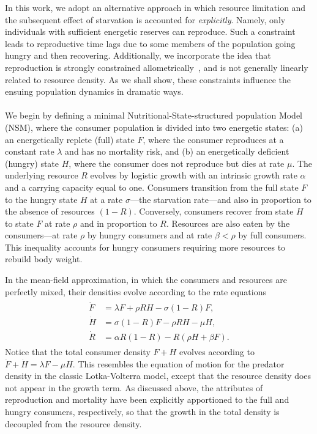 \documentclass{pnastwo}
\begin{document}
\begin{article}
In this work, we adopt an alternative approach in which resource limitation
and the subsequent effect of starvation is accounted for \emph{explicitly}.
Namely, only individuals with sufficient energetic reserves can reproduce.
Such a constraint leads to reproductive time lags due to some members of the
population going hungry and then recovering.  Additionally, we incorporate the
idea that reproduction is strongly constrained
allometrically~\cite{Kempes:2012hy}, and is not generally linearly related to
resource density.  As we shall show, these constraints influence the ensuing
population dynamics in dramatic ways.
\\

\\
We begin by defining a minimal Nutritional-State-structured population Model
(NSM), where the consumer population is divided into two energetic states:
(a) an energetically replete (full) state $F$, where the consumer reproduces
at a constant rate $\lambda$ and has no mortality risk, and (b) an
energetically deficient (hungry) state $H$, where the consumer does not
reproduce but dies at rate $\mu$.  The underlying resource $R$ evolves by
logistic growth with an intrinsic growth rate $\alpha$ and a carrying
capacity equal to one.  Consumers transition from the full state $F$ to the
hungry state $H$ at a rate $\sigma$---the starvation rate---and also in
proportion to the absence of resources $(1-R)$.  Conversely, consumers
recover from state $H$ to state $F$ at rate $\rho$ and in proportion to $R$.
Resources are also eaten by the consumers---at rate $\rho$ by hungry
consumers and at rate $\beta<\rho$ by full consumers.  This inequality
accounts for hungry consumers requiring more resources to rebuild body
weight.

In the mean-field approximation, in which the consumers and resources are
perfectly mixed, their densities evolve according to the rate equations
\begin{eqnarray} 
\label{eq:system}
\begin{split}
\dot{F} &= \lambda F + \rho RH - \sigma (1-R)F,  \\
\dot{H} &= \sigma (1-R)F - \rho RH - \mu H,  \\
\dot{R} &= \alpha R(1-R) - R(\rho H+ \beta F).
\end{split}
\end{eqnarray}
Notice that the total consumer density $F+H$ evolves according to
$\dot{F}+\dot{H}=\lambda F-\mu H$.  This resembles the equation of motion for
the predator density in the classic Lotka-Volterra model, except that the
resource density does not appear in the growth term.  As discussed above, the
attributes of reproduction and mortality have been explicitly apportioned to
the full and hungry consumers, respectively, so that the growth in the total
density is decoupled from the resource density.


\end{article}
\end{document}
